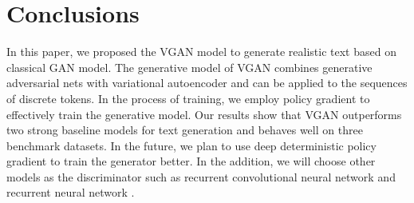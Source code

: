 \documentclass{llncs}
\begin{document}
\section{Conclusions}
In this paper, we proposed the VGAN model to generate realistic text based on classical GAN model. The generative model of VGAN combines generative adversarial nets with variational autoencoder and can be applied to the sequences of discrete tokens. In the process of training, we employ policy gradient to effectively train the generative model. Our results show that VGAN outperforms two strong baseline models for text generation and behaves well on three benchmark datasets. In the future, we plan to use deep deterministic policy gradient \cite{lillicrap2016continuous} to train the generator better. In the addition, we will choose other models as the discriminator such as recurrent convolutional neural network \cite{lai2015recurrent} and recurrent neural network \cite{liu2016recurrent}. 


\end{document}

